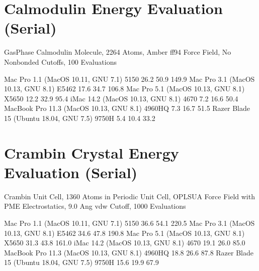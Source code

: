 \documentclass[letterpaper,11pt,english]{sphinxmanual}
\begin{document}
\section{Calmodulin Energy Evaluation (Serial)}
\label{\detokenize{text/benchmarks:calmodulin-energy-evaluation-serial}}
Gas\sphinxhyphen{}Phase Calmodulin Molecule, 2264 Atoms, Amber ff94 Force Field, No Nonbonded Cutoffs, 100 Evaluations


\begin{sphinxVerbatim}[commandchars=\\\{\}]
Mac Pro 1.1 (MacOS 10.11, GNU 7.1)             5150        26.2         50.9       149.9
Mac Pro 3.1 (MacOS 10.13, GNU 8.1)            E5462        17.6         34.7       106.8
Mac Pro 5.1 (MacOS 10.13, GNU 8.1)            X5650        12.2         32.9        95.4
iMac 14.2 (MacOS 10.13, GNU 8.1)               4670         7.2         16.6        50.4
MacBook Pro 11.3 (MacOS 10.13, GNU 8.1)      4960HQ         7.3         16.7        51.5
Razer Blade 15 (Ubuntu 18.04, GNU 7.5)        9750H         5.4         10.4        33.2
\end{sphinxVerbatim}


\section{Crambin Crystal Energy Evaluation (Serial)}
\label{\detokenize{text/benchmarks:crambin-crystal-energy-evaluation-serial}}
Crambin Unit Cell, 1360 Atoms in Periodic Unit Cell, OPLS\sphinxhyphen{}UA Force Field with PME Electrostatics, 9.0 Ang vdw Cutoff, 1000 Evaluations


\begin{sphinxVerbatim}[commandchars=\\\{\}]
Mac Pro 1.1 (MacOS 10.11, GNU 7.1)             5150        36.6         54.1       220.5
Mac Pro 3.1 (MacOS 10.13, GNU 8.1)            E5462        34.6         47.8       190.8
Mac Pro 5.1 (MacOS 10.13, GNU 8.1)            X5650        31.3         43.8       161.0
iMac 14.2 (MacOS 10.13, GNU 8.1)               4670        19.1         26.0        85.0
MacBook Pro 11.3 (MacOS 10.13, GNU 8.1)      4960HQ        18.8         26.6        87.8
Razer Blade 15 (Ubuntu 18.04, GNU 7.5)        9750H        15.6         19.9        67.9
\end{sphinxVerbatim}
\end{document}
